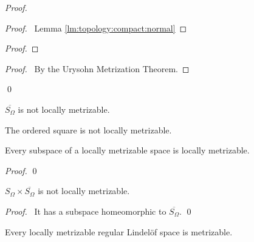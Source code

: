 \begin{proof}
\pf
{}
\begin{proof}
  \pf\ Lemma \ref{lm:topology:compact:normal}
\end{proof}
\begin{proof}
\end{proof}
\qedstep
\begin{proof}
  \pf\ By the Urysohn Metrization Theorem.
\end{proof}
\qed
\end{proof}

\begin{cor}
 $\overline{S_\Omega}$ is not locally metrizable.
\end{cor}

\begin{cor}
The ordered square is not locally metrizable.
\end{cor}

\begin{prop}
Every subspace of a locally metrizable space is locally metrizable.
\end{prop}

\begin{proof}
\pf
{}
\qed
\end{proof}

\begin{cor}
$S_\Omega \times \overline{S_\Omega}$ is not locally metrizable.
\end{cor}

\begin{proof}
\pf\ It has a subspace homeomorphic to $\overline{S_\Omega}$. \qed
\end{proof}

\begin{prop}[CC]
 Every locally metrizable regular Lindel\"{o}f space is metrizable.
\end{prop}

